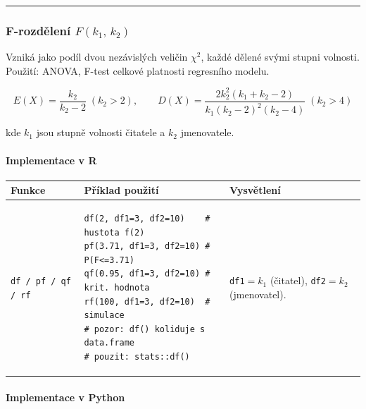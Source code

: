 \documentclass[a4paper, 11pt]{article}
\newenvironment{funkcedict}
{%
  \begingroup
  \renewcommand{\arraystretch}{1.4}%
  \lstset{basicstyle=\ttfamily\small, columns=fullflexible}%
  \setlength{\tabcolsep}{4pt}%
  \begin{tabular}{p{0.19\textwidth} p{0.38\textwidth} p{0.30\textwidth}}
  \textbf{Funkce} & \textbf{Příklad použití} & \textbf{Vysvětlení} \\
  \midrule
}
{%
  \end{tabular}%
  \endgroup
}
\begin{document}
\noindent\hrule\medskip

\subsubsection{F-rozdělení $F(k_1,\,k_2)$}

Vzniká jako podíl dvou nezávislých veličin $\chi^2$, každé dělené svými
stupni volnosti. Použití: ANOVA, F-test celkové platnosti regresního modelu.

\begin{equation*}
	E(X) = \frac{k_2}{k_2 - 2}\; (k_2 > 2), \qquad
	D(X) = \frac{2k_2^2(k_1+k_2-2)}{k_1(k_2-2)^2(k_2-4)}\; (k_2 > 4)
\end{equation*}

kde $k_1$ jsou stupně volnosti čitatele a $k_2$ jmenovatele.

\begin{center}
\end{center}

\paragraph{Implementace v R}\mbox{}\par

\begin{funkcedict}
	\texttt{df / pf / qf / rf} &
	\begin{lstlisting}
df(2, df1=3, df2=10)    # hustota f(2)
pf(3.71, df1=3, df2=10) # P(F<=3.71)
qf(0.95, df1=3, df2=10) # krit. hodnota
rf(100, df1=3, df2=10)  # simulace
# pozor: df() koliduje s data.frame
# pouzit: stats::df()
	\end{lstlisting}
	& \texttt{df1}$=k_1$ (čitatel), \texttt{df2}$=k_2$ (jmenovatel). \\
\end{funkcedict}

\paragraph{Implementace v Python}\mbox{}\par
\end{document}
